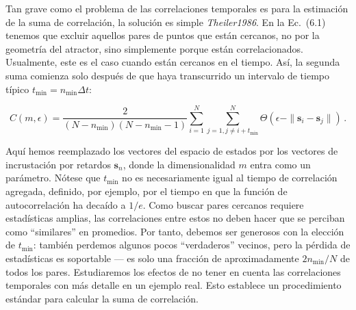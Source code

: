 \documentclass[10pt,a4paper]{book}
\begin{document}
\bigskip

Tan grave como el problema de las correlaciones temporales es para la estimación de la suma de correlación, la solución es simple \textit{Theiler1986}. En la Ec.~(6.1) tenemos que excluir aquellos pares de puntos que están cercanos, no por la geometría del atractor, sino simplemente porque están correlacionados. Usualmente, este es el caso cuando están cercanos en el tiempo. Así, la segunda suma comienza solo después de que haya transcurrido un intervalo de tiempo típico $t_{\min} = n_{\min} \Delta t$:

\begin{equation}
C(m, \epsilon) = \frac{2}{(N - n_{\min})(N - n_{\min} - 1)} \sum_{i=1}^{N} \sum_{j=1, j \neq i + t_{\min}}^{N} \Theta(\epsilon - \| \mathbf{s}_i - \mathbf{s}_j \|) \,.
\end{equation}

Aquí hemos reemplazado los vectores del espacio de estados por los vectores de incrustación por retardos $\mathbf{s}_n$, donde la dimensionalidad $m$ entra como un parámetro. Nótese que $t_{\min}$ no es necesariamente igual al tiempo de correlación agregada, definido, por ejemplo, por el tiempo en que la función de autocorrelación ha decaído a $1/e$. Como buscar pares cercanos requiere estadísticas amplias, las correlaciones entre estos no deben hacer que se perciban como ``similares'' en promedios. Por tanto, debemos ser generosos con la elección de $t_{\min}$: también perdemos algunos pocos ``verdaderos'' vecinos, pero la pérdida de estadísticas es soportable — es solo una fracción de aproximadamente $2 n_{\min} / N$ de todos los pares. Estudiaremos los efectos de no tener en cuenta las correlaciones temporales con más detalle en un ejemplo real. Esto establece un procedimiento estándar para calcular la suma de correlación.

\newpage
\end{document}
